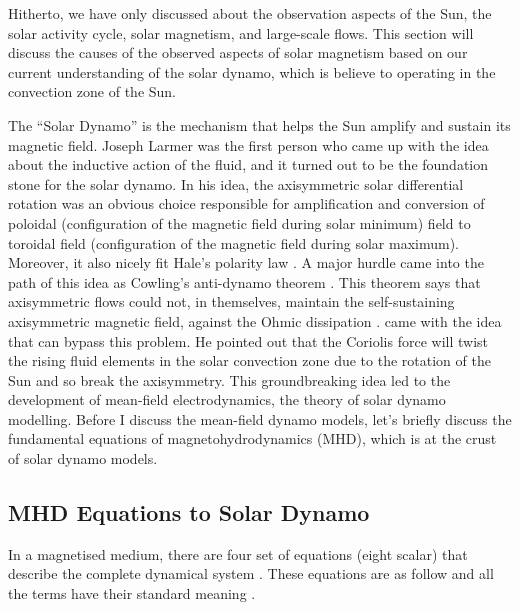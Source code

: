 Hitherto, we have only discussed about the observation aspects of the Sun, the solar activity cycle, solar magnetism, and large\hyp scale flows. This section will discuss the causes of the observed aspects of solar magnetism based on our current understanding of the solar dynamo, which is believe to operating in the convection zone of the Sun.

The ``Solar Dynamo'' is the mechanism that helps the Sun amplify and sustain its magnetic field. Joseph Larmer was the first person who came up with the idea about the inductive action of the fluid, and it turned out to be the foundation stone for the solar dynamo. In his idea, the axisymmetric solar differential rotation was an obvious choice responsible for amplification and conversion of poloidal (configuration of the magnetic field during solar minimum) field to toroidal field (configuration of the magnetic field during solar maximum). Moreover, it also nicely fit Hale's polarity law \citep{Hale1919}. A major hurdle came into the path of this idea as Cowling's anti-dynamo theorem \citep{Cowling1933}. This theorem says that axisymmetric flows could not, in themselves, maintain the self-sustaining axisymmetric magnetic field, against the Ohmic dissipation \citep{Cowling1933, Charbonneau2010}. \citet{Parker1955} came with the idea that can bypass this problem. He pointed out that the Coriolis force will twist the rising fluid elements in the solar convection zone due to the rotation of the Sun and so break the axisymmetry. This groundbreaking idea led to the development of mean-field electrodynamics, the theory of solar dynamo modelling. Before I discuss the mean-field dynamo models, let's briefly discuss the fundamental equations of magnetohydrodynamics (MHD), which is at the crust of solar dynamo models.

\subsection{MHD Equations to Solar Dynamo}
In a magnetised medium, there are four set of equations (eight scalar) that describe the complete dynamical system \citep{Choudhuri1998book}. These equations are as follow and all the terms have their standard meaning \citep[see][for details about these equation]{Priest2014book}.

